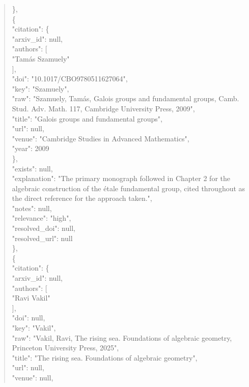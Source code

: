 \documentclass[11pt]{article}
\begin{document}
\begin{quote}
    \},\\
    \{\\
      "citation": \{\\
        "arxiv\_id": null,\\
        "authors": [\\
          "Tamás Szamuely"\\
        ],\\
        "doi": "10.1017/CBO9780511627064",\\
        "key": "Szamuely",\\
        "raw": "Szamuely, Tamás, Galois groups and fundamental groups, Camb. Stud. Adv. Math. 117, Cambridge University Press, 2009",\\
        "title": "Galois groups and fundamental groups",\\
        "url": null,\\
        "venue": "Cambridge Studies in Advanced Mathematics",\\
        "year": 2009\\
      \},\\
      "exists": null,\\
      "explanation": "The primary monograph followed in Chapter 2 for the algebraic construction of the étale fundamental group, cited throughout as the direct reference for the approach taken.",\\
      "notes": null,\\
      "relevance": "high",\\
      "resolved\_doi": null,\\
      "resolved\_url": null\\
    \},\\
    \{\\
      "citation": \{\\
        "arxiv\_id": null,\\
        "authors": [\\
          "Ravi Vakil"\\
        ],\\
        "doi": null,\\
        "key": "Vakil",\\
        "raw": "Vakil, Ravi, The rising sea. Foundations of algebraic geometry, Princeton University Press, 2025",\\
        "title": "The rising sea. Foundations of algebraic geometry",\\
        "url": null,\\
        "venue": null,\\

\end{quote}
\end{document}
